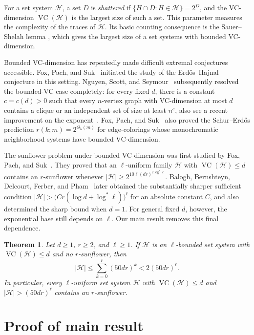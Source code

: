 \documentclass[11pt]{article}
\newtheorem{theorem}{Theorem}[section]
\theoremstyle{definition}
\newcommand*{\abs}[1]{\lvert#1\rvert}
\newcommand{\cH}{\mathcal{H}}
\newcommand{\VC}{\operatorname{VC}}
\begin{document}
For a set system \(\cH\), a set \(D\) is \emph{shattered} if \(\{H\cap D:H\in\cH\}=2^{D}\), and the VC-dimension \(\VC(\cH)\) is the largest size of such a set. This parameter measures the complexity of the traces of \(\cH\). Its basic counting consequence is the Sauer--Shelah lemma \cite{Sauer72,Shelah72,VC71}, which gives the largest size of a set systems with bounded VC-dimension.

Bounded VC-dimension has repeatedly made difficult extremal conjectures accessible. Fox, Pach, and Suk~\cite{FPS19} initiated the study of the Erd\H{o}s--Hajnal conjecture in this setting. Nguyen, Scott, and Seymour~\cite{NSS25} subsequently resolved the bounded-VC case completely: for every fixed \(d\), there is a constant \(c=c(d)>0\) such that every \(n\)-vertex graph with VC-dimension at most \(d\) contains a clique or an independent set of size at least \(n^{c}\), also see a recent improvement on the exponent~\cite{SWZ26}. Fox, Pach, and Suk~\cite{FPS21} also proved the Schur--Erd\H{o}s prediction \(r(k;m)=2^{\Theta_{k}(m)}\) for edge-colorings whose monochromatic neighborhood systems have bounded VC-dimension.

The sunflower problem under bounded VC-dimension was first studied by Fox, Pach, and Suk~\cite{FPS23}. They proved that an \(\ell\)-uniform family \(\cH\) with \(\VC(\cH)\le d\) contains an \(r\)-sunflower whenever \(\abs{\cH}\ge 2^{10\ell(dr)^{2\log^{*}\ell}}\). Balogh, Bernshteyn, Delcourt, Ferber, and Pham~\cite{BBDFP25} later obtained the substantially sharper sufficient condition \(\abs{\cH}>\bigl(Cr(\log d+\log^{*}\ell)\bigr)^{\ell}\) for an absolute constant \(C\), and also determined the sharp bound when \(d=1\). For general fixed \(d\), however, the exponential base still depends on \(\ell\). Our main result removes this final dependence.

\begin{theorem}\label{thm:main}
Let \(d\ge 1\), \(r\ge 2\), and \(\ell\ge 1\). If \(\cH\) is an \(\ell\)-bounded set system with \(\VC(\cH)\le d\) and no \(r\)-sunflower, then
\[
\abs{\cH}\le \sum_{k=0}^{\ell}(50dr)^{k}<2(50dr)^{\ell}.
\]
In particular, every \(\ell\)-uniform set system \(\cH\) with \(\VC(\cH)\le d\) and \(\abs{\cH}>(50dr)^{\ell}\) contains an \(r\)-sunflower.
\end{theorem}

\section{Proof of main result}
\end{document}
